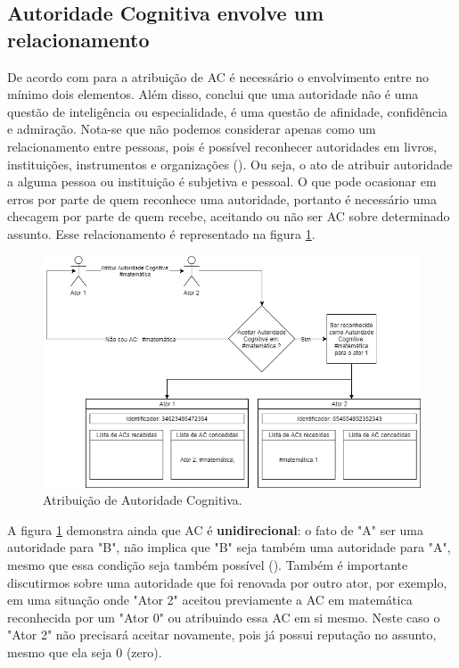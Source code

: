 \subsection{Autoridade Cognitiva envolve um relacionamento}

De acordo com \cite{Wilson1983} para a atribuição de AC é necessário o envolvimento entre no mínimo dois elementos. Além disso, \cite{pamela_j._mckenzie_justifying_2003} conclui que uma autoridade não é uma questão de inteligência ou especialidade, é uma questão de afinidade, confidência e admiração. Nota-se que não podemos considerar apenas como um relacionamento entre pessoas, pois é possível reconhecer autoridades em livros, instituições, instrumentos e organizações (\cite{soo_young_rieh_credibility_2010}). Ou seja, o ato de atribuir autoridade a alguma pessoa ou instituição é subjetiva e pessoal. O que pode ocasionar em erros por parte de quem reconhece uma autoridade, portanto é necessário uma checagem por parte de quem recebe, aceitando ou não ser AC sobre determinado assunto. Esse relacionamento é representado na figura \ref{fig:diagrama_relacionamento}.

\begin{figure}[ht]
\centering
\includegraphics[scale=0.58]{4-proposta/diagrama_relacionamento.png}
\caption{Atribuição de Autoridade Cognitiva.}
\label{fig:diagrama_relacionamento}
\end{figure}

A figura \ref{fig:diagrama_relacionamento} demonstra ainda que AC é \textbf{unidirecional}: o fato de "A" ser uma autoridade para "B", não implica que "B" seja também uma autoridade para "A", mesmo que essa condição seja também possível (\cite{pereira_folkauthority:_2008}). Também é importante discutirmos sobre uma autoridade que foi renovada por outro ator, por exemplo, em uma situação onde "Ator 2" aceitou previamente a AC em matemática reconhecida por  um "Ator 0" ou atribuindo essa AC em si mesmo. Neste caso o "Ator 2" não precisará aceitar novamente, pois já possui reputação no assunto, mesmo que ela seja 0 (zero). 

